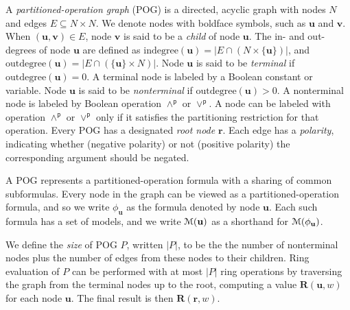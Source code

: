 \documentclass[letterpaper,USenglish,cleveref, autoref, thm-restate]{lipics-v2021}
\newcommand{\pand}{\mathbin{\land^\textsf{p}}}
\newcommand{\por}{\mathbin{\lor^\textsf{p}}}
\newcommand{\rep}{\textbf{R}}
\newcommand{\modelset}{{\cal M}}
\newcommand{\indegree}{\textrm{indegree}}
\newcommand{\outdegree}{\textrm{outdegree}}
\newcommand{\makenode}[1]{\mathbf{#1}}
\newcommand{\nodeu}{\makenode{u}}
\newcommand{\nodev}{\makenode{v}}
\newcommand{\noder}{\makenode{r}}
\begin{document}
A \emph{partitioned-operation graph} (POG) is a directed, acyclic
graph with nodes $N$ and edges $E \subseteq N \times N$.  We denote
nodes with boldface symbols, such as $\nodeu$ and $\nodev$.  When
$(\nodeu,\nodev) \in E$, node $\nodev$ is said to be a \emph{child} of
node $\nodeu$.  The in- and out-degrees of node $\nodeu$ are defined
as $\indegree(\nodeu) = | E \cap (N \times \{\nodeu\}) |$, and
$\outdegree(\nodeu) = | E \cap (\{\nodeu\} \times N) |$.  Node
$\nodeu$ is said to be \emph{terminal} if $\outdegree(\nodeu) = 0$.  A
terminal node is labeled by a Boolean constant or variable.  Node
$\nodeu$ is said to be \emph{nonterminal} if $\outdegree(\nodeu) > 0$.
A nonterminal node is labeled by Boolean operation $\pand$ or $\por$.
A node can be labeled with operation $\pand$ or $\por$ only if it
satisfies the partitioning restriction for that operation.  Every POG
has a designated \emph{root node} $\noder$.  Each edge has
a \emph{polarity}, indicating whether (negative polarity) or not
(positive polarity) the corresponding argument should be negated.

A POG represents a partitioned-operation
formula with a sharing of common subformulas.  Every node in the graph can be viewed as a partitioned-operation formula, and so we write
$\phi_{\nodeu}$ as the formula denoted by node $\nodeu$.
Each such formula has a set of models, and we write $\modelset(\nodeu)$ as a shorthand for $\modelset(\phi_{\nodeu})$.

We define the \emph{size} of POG $P$, written $|P|$, to be the
the number of nonterminal nodes plus the number of edges from these nodes to their children.  Ring
evaluation of $P$ can be performed with at most $|P|$ ring
operations by traversing the graph from the terminal nodes up to
the root, computing a value $\rep(\nodeu, w)$ for each node $\nodeu$.
The final result is then $\rep(\noder, w)$.
\end{document}
